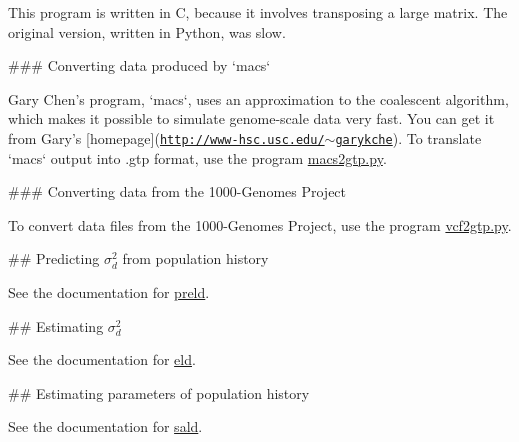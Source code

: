 \-This program is written in \-C, because it involves transposing a large matrix. \-The original version, written in \-Python, was slow.

\#\#\# \-Converting data produced by `macs`

\-Gary \-Chen's program, `macs`, uses an approximation to the coalescent algorithm, which makes it possible to simulate genome-\/scale data very fast. \-You can get it from \-Gary's \mbox{[}homepage\mbox{]}(\href{http://www-hsc.usc.edu/~garykche}{\tt http\-://www-\/hsc.\-usc.\-edu/$\sim$garykche}). \-To translate `macs` output into .gtp format, use the program \hyperlink{macs2gtp_8py_macs2gtp}{macs2gtp.py}.

\#\#\# \-Converting data from the 1000-\/\-Genomes \-Project

\-To convert data files from the 1000-\/\-Genomes \-Project, use the program \hyperlink{vcf2gtp_8py_vcf2gtp}{vcf2gtp.py}.

\#\# \-Predicting $\sigma_d^2$ from population history

\-See the documentation for \hyperlink{preld_8c_preld}{preld}.

\#\# \-Estimating $\sigma_d^2$

\-See the documentation for \hyperlink{eld_8c_eld}{eld}.

\#\# \-Estimating parameters of population history

\-See the documentation for \hyperlink{sald_8c_sald}{sald}. 